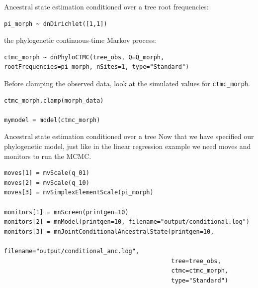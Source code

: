 \documentclass[mathserif]{beamer}
\begin{document}
\begin{frame}[fragile]
    \begin{block}{Ancestral state estimation conditioned over a tree}
    \bigskip
 root frequencies:
    \bigskip
    \begin{lstlisting}
pi_morph ~ dnDirichlet([1,1])
    \end{lstlisting}
    \bigskip
the phylogenetic continuous-time Markov process:
    \bigskip
    \begin{lstlisting}
ctmc_morph ~ dnPhyloCTMC(tree_obs, Q=Q_morph, rootFrequencies=pi_morph, nSites=1, type="Standard")
    \end{lstlisting}
    \bigskip
    Before clamping the observed data, look at the simulated values for \texttt{ctmc\_morph}.
    \bigskip
    \begin{lstlisting}
ctmc_morph.clamp(morph_data)

mymodel = model(ctmc_morph)
    \end{lstlisting}
  
    \end{block}
\end{frame}



\begin{frame}[fragile]
    \begin{block}{Ancestral state estimation conditioned over a tree}
    \bigskip
        Now that we have specified our phylogenetic model,
        just like in the linear regression example we need \alert{moves} and \alert{monitors} 
        to run the MCMC.
    \bigskip
    \begin{lstlisting}
moves[1] = mvScale(q_01)
moves[2] = mvScale(q_10)
moves[3] = mvSimplexElementScale(pi_morph)

monitors[1] = mnScreen(printgen=10)
monitors[2] = mnModel(printgen=10, filename="output/conditional.log")
monitors[3] = mnJointConditionalAncestralState(printgen=10, 
                                               filename="output/conditional_anc.log", 
                                               tree=tree_obs, 
                                               ctmc=ctmc_morph, 
                                               type="Standard")
    \end{lstlisting}
    \end{block}
\end{frame}
\end{document}
